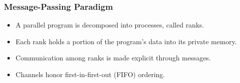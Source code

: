 \begin{frame}\frametitle{Message-Passing Paradigm}

\vspace{5mm}
\begin{itemize}
\item {\Large A parallel program is decomposed into processes, called ranks.}
\vspace{3mm}
\item {\Large Each rank holds a portion of the program’s data into its private memory.}
\vspace{3mm}
\item {\Large Communication among ranks is made explicit through messages.}
\vspace{3mm}
\item {\Large Channels honor first-in-first-out (FIFO) ordering.}
\end{itemize}

\end{frame}

